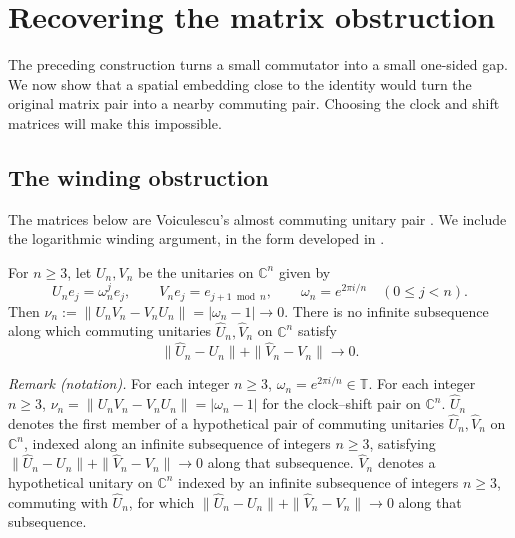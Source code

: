 \section{Recovering the matrix obstruction}\label{sec:obstruction}

The preceding construction turns a small commutator into a small
one-sided gap. We now show that a spatial embedding close to the
identity would turn the original matrix pair into a nearby commuting
pair. Choosing the clock and shift matrices will make this impossible.

\subsection{The winding obstruction}
The matrices below are Voiculescu's almost commuting unitary pair
\cite{Voi1983}. We include the logarithmic winding argument, in the
form developed in \cite{EL1989,Exel1993}.

\begin{lemma}\label{lem:clock}
For $n\geq3$, let $U_n,V_n$ be the unitaries on $\mathbb C^n$ given by
\begin{equation}\label{eq:clock-shift}
 U_ne_j=\omega_n^je_j,\qquad
 V_ne_j=e_{j+1\bmod n},\qquad
 \omega_n=e^{2\pi i/n}\quad(0\leq j<n).
\end{equation}
Then $\nu_n:=\|U_nV_n-V_nU_n\|=|\omega_n-1|\to0$.
There is no infinite subsequence along which commuting unitaries
$\widehat U_n,\widehat V_n$ on $\mathbb C^n$ satisfy
\[
 \|\widehat U_n-U_n\|+\|\widehat V_n-V_n\|\longrightarrow0.
\]
\end{lemma}

\noindent\textit{Remark (notation).} For each integer $n\geq3$, $\omega_n=e^{2\pi i/n}\in\mathbb T$. For each integer $n\geq3$, $\nu_n=\|U_nV_n-V_nU_n\|=|\omega_n-1|$ for the clock--shift pair on $\mathbb C^n$. $\widehat U_n$ denotes the first member of a hypothetical pair of commuting unitaries $\widehat U_n,\widehat V_n$ on $\mathbb C^n$, indexed along an infinite subsequence of integers $n\geq3$, satisfying $\|\widehat U_n-U_n\|+\|\widehat V_n-V_n\|\longrightarrow0$ along that subsequence. $\widehat V_n$ denotes a hypothetical unitary on $\mathbb C^n$ indexed by an infinite subsequence of integers $n\geq3$, commuting with $\widehat U_n$, for which $\|\widehat U_n-U_n\|+\|\widehat V_n-V_n\|\longrightarrow0$ along that subsequence.


